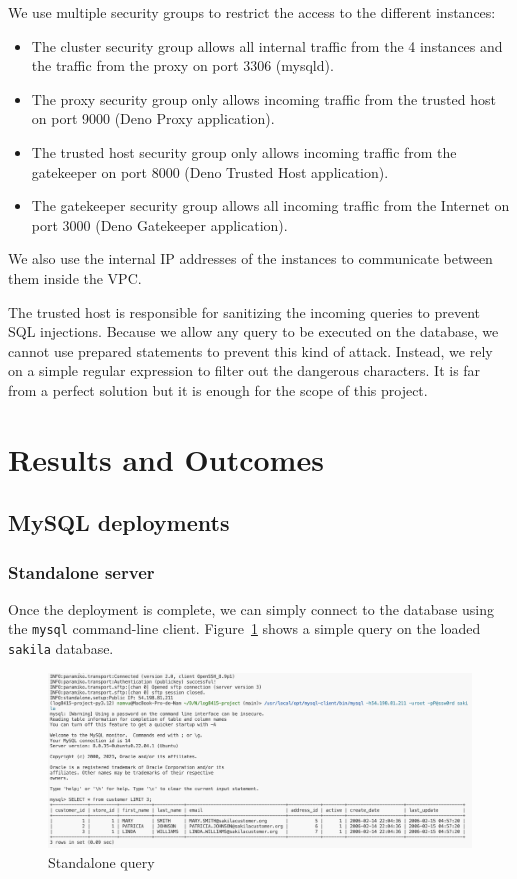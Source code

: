 \documentclass[letterpaper,headings=standardclasses,parskip=half]{scrartcl}
\begin{document}
We use multiple security groups to restrict the access to the different instances:

\begin{itemize}
    \item The cluster security group allows all internal traffic from the 4 instances and the traffic from the proxy on port 3306 (mysqld).
    \item The proxy security group only allows incoming traffic from the trusted host on port 9000 (Deno Proxy application).
    \item The trusted host security group only allows incoming traffic from the gatekeeper on port 8000 (Deno Trusted Host application).
    \item The gatekeeper security group allows all incoming traffic from the Internet on port 3000 (Deno Gatekeeper application).
\end{itemize}

We also use the internal IP addresses of the instances to communicate between them inside the VPC.

The trusted host is responsible for sanitizing the incoming queries to prevent SQL injections. Because we allow any query to be executed on the database, we cannot use prepared statements to prevent this kind of attack. Instead, we rely on a simple regular expression to filter out the dangerous characters. It is far from a perfect solution but it is enough for the scope of this project.

\clearpage
\section{Results and Outcomes}

\subsection{MySQL deployments}

\subsubsection{Standalone server}

Once the deployment is complete, we can simply connect to the database using the \texttt{mysql} command-line client. Figure~\ref{fig:standalone_query} shows a simple query on the loaded \texttt{sakila} database.

\begin{figure}[h]
    \centering
    \includegraphics[width=\linewidth]{figures/Screenshot 2023-12-25 at 16.16.05.png}
    \caption{Standalone query}
    \label{fig:standalone_query}
\end{figure}
\end{document}
